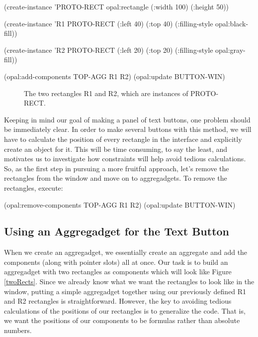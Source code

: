\begin{programexample}
(create-instance 'PROTO-RECT opal:rectangle
   (:width 100) (:height 50))

(create-instance 'R1 PROTO-RECT
   (:left 40) (:top 40)
   (:filling-style opal:black-fill))

(create-instance 'R2 PROTO-RECT
    (:left 20) (:top 20)
    (:filling-style opal:gray-fill))

(opal:add-components TOP-AGG R1 R2)
(opal:update BUTTON-WIN)
\end{programexample}

\begin{figure}
\begin{center}
\end{center}
\caption{The two rectangles R1 and R2, which are instances of PROTO-RECT.}
\end{figure}

Keeping in mind our goal of making a panel of text buttons, one
problem should be immediately clear.  In order to make several
buttons with this method, we will have to calculate the position of
every rectangle in the interface and explicitly create an object for
it.  This will be time consuming, to say the least, and motivates us
to investigate how constraints will help avoid tedious calculations.
So, as the first step in pursuing a more fruitful approach, let's
remove the rectangles from the window and move on to aggregadgets.
To remove the rectangles, execute:

\begin{programexample}
(opal:remove-components TOP-AGG R1 R2)
(opal:update BUTTON-WIN)
\end{programexample}


\subsection{Using an Aggregadget for the Text Button}

When we create an aggregadget, we essentially create an aggregate and
add the components (along with pointer slots) all at once.  Our task
is to build an aggregadget
with two rectangles as components which will look like Figure
\ref{twoRects}.  Since we already know what we want the
rectangles to look like in the window, putting a simple aggregadget
together using our previously defined R1 and R2 rectangles is
straightforward.  However, the key to avoiding tedious
calculations of the positions of our rectangles is to generalize the
code.  That is, we want the positions of our components to be formulas
rather than absolute numbers.

